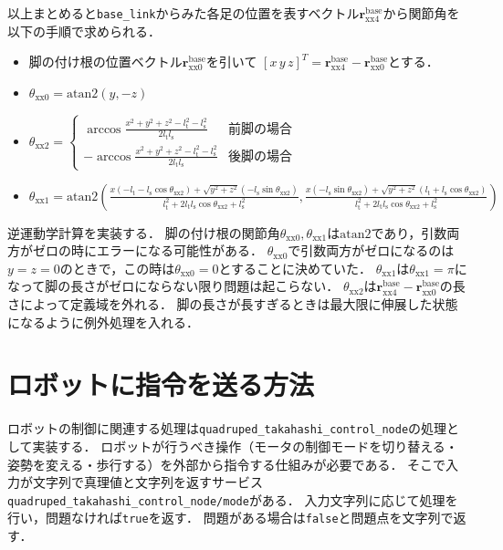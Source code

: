\documentclass[a4paper]{jlreq}
\begin{document}
  以上まとめると\texttt{base\_link}からみた各足の位置を表すベクトル$\boldsymbol{r}_\mathrm{xx4}^\mathrm{base}$から関節角を以下の手順で求められる．
  \begin{itemize}
    \item 脚の付け根の位置ベクトル$\boldsymbol{r}^\mathrm{base}_\mathrm{xx0}$を引いて
    $[x\, y\, z]^T = \boldsymbol{r}_\mathrm{xx4}^\mathrm{base} - \boldsymbol{r}^\mathrm{base}_\mathrm{xx0}$とする．
    \item $\theta_\mathrm{xx0} = \mathrm{atan2}\left(y, -z\right)$
    \item $\theta_\mathrm{xx2} = \begin{cases}
      \arccos{\frac{x^2 + y^2 + z^2 - l_\mathrm{t}^2 - l_\mathrm{s}^2}{2l_\mathrm{t}l_\mathrm{s}}} & \text{前脚の場合} \\
      -\arccos{\frac{x^2 + y^2 + z^2 - l_\mathrm{t}^2 - l_\mathrm{s}^2}{2l_\mathrm{t}l_\mathrm{s}}} & \text{後脚の場合}
    \end{cases}$
    \item $\theta_\mathrm{xx1} = \mathrm{atan2}\left(
      \frac{x\left(-l_\mathrm{t} - l_\mathrm{s}\cos\theta_\mathrm{xx2}\right) + \sqrt{y^2 + z^2}\left(-l_\mathrm{s}\sin\theta_\mathrm{xx2}\right)}
      {l_\mathrm{t}^2 + 2l_\mathrm{t}l_\mathrm{s}\cos\theta_\mathrm{xx2} + l_\mathrm{s}^2},
      \frac{x\left(-l_\mathrm{s}\sin\theta_\mathrm{xx2}\right) + \sqrt{y^2 + z^2}\left(l_\mathrm{t} + l_\mathrm{s}\cos\theta_\mathrm{xx2}\right)}
      {l_\mathrm{t}^2 + 2l_\mathrm{t}l_\mathrm{s}\cos\theta_\mathrm{xx2} + l_\mathrm{s}^2}
    \right)$
  \end{itemize}

  逆運動学計算を実装する．
  脚の付け根の関節角$\theta_\mathrm{xx0}, \theta_\mathrm{xx1}$は$\mathrm{atan2}$であり，引数両方がゼロの時にエラーになる可能性がある．
  $\theta_\mathrm{xx0}$で引数両方がゼロになるのは$y = z = 0$のときで，この時は$\theta_\mathrm{xx0} = 0$とすることに決めていた．
  $\theta_\mathrm{xx1}$は$\theta_\mathrm{xx1} = \pi$になって脚の長さがゼロにならない限り問題は起こらない．
  $\theta_\mathrm{xx2}$は$\boldsymbol{r}_\mathrm{xx4}^\mathrm{base} - \boldsymbol{r}^\mathrm{base}_\mathrm{xx0}$の長さによって定義域を外れる．
  脚の長さが長すぎるときは最大限に伸展した状態になるように例外処理を入れる．

\section{ロボットに指令を送る方法}

ロボットの制御に関連する処理は\texttt{quadruped\_takahashi\_control\_node}の処理として実装する．
ロボットが行うべき操作（モータの制御モードを切り替える・姿勢を変える・歩行する）を外部から指令する仕組みが必要である．
そこで入力が文字列で真理値と文字列を返すサービス\texttt{quadruped\_takahashi\_control\_node/mode}がある．
入力文字列に応じて処理を行い，問題なければ\texttt{true}を返す．
問題がある場合は\texttt{false}と問題点を文字列で返す．
\end{document}
